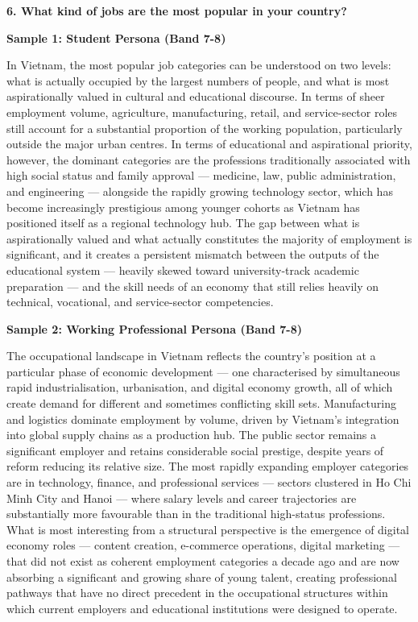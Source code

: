 \separator

\begin{ieltsquestion}
\textbf{6. What kind of jobs are the most popular in your country?}
\end{ieltsquestion}
\textbf{Sample 1: Student Persona (Band 7-8)}

In Vietnam, the most popular job categories can be understood on two levels: what is actually occupied by the largest numbers of people, and what is most aspirationally valued in cultural and educational discourse. In terms of sheer employment volume, agriculture, manufacturing, retail, and service-sector roles still account for a substantial proportion of the working population, particularly outside the major urban centres. In terms of educational and aspirational priority, however, the dominant categories are the professions traditionally associated with high social status and family approval — medicine, law, public administration, and engineering — alongside the rapidly growing technology sector, which has become increasingly prestigious among younger cohorts as Vietnam has positioned itself as a regional technology hub. The gap between what is aspirationally valued and what actually constitutes the majority of employment is significant, and it creates a persistent mismatch between the outputs of the educational system — heavily skewed toward university-track academic preparation — and the skill needs of an economy that still relies heavily on technical, vocational, and service-sector competencies.

\textbf{Sample 2: Working Professional Persona (Band 7-8)}

The occupational landscape in Vietnam reflects the country's position at a particular phase of economic development — one characterised by simultaneous rapid industrialisation, urbanisation, and digital economy growth, all of which create demand for different and sometimes conflicting skill sets. Manufacturing and logistics dominate employment by volume, driven by Vietnam's integration into global supply chains as a production hub. The public sector remains a significant employer and retains considerable social prestige, despite years of reform reducing its relative size. The most rapidly expanding employer categories are in technology, finance, and professional services — sectors clustered in Ho Chi Minh City and Hanoi — where salary levels and career trajectories are substantially more favourable than in the traditional high-status professions. What is most interesting from a structural perspective is the emergence of digital economy roles — content creation, e-commerce operations, digital marketing — that did not exist as coherent employment categories a decade ago and are now absorbing a significant and growing share of young talent, creating professional pathways that have no direct precedent in the occupational structures within which current employers and educational institutions were designed to operate.

